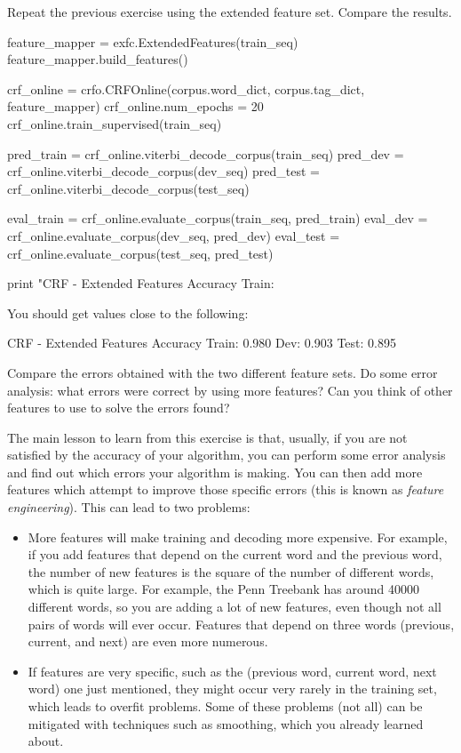 \begin{exercise}\label{exer:crf2}
Repeat the previous exercise using the extended feature set. Compare the results.

\begin{python}
feature_mapper = exfc.ExtendedFeatures(train_seq)
feature_mapper.build_features()

crf_online = crfo.CRFOnline(corpus.word_dict, corpus.tag_dict, feature_mapper)
crf_online.num_epochs = 20
crf_online.train_supervised(train_seq)

pred_train = crf_online.viterbi_decode_corpus(train_seq)
pred_dev = crf_online.viterbi_decode_corpus(dev_seq)
pred_test = crf_online.viterbi_decode_corpus(test_seq)

eval_train = crf_online.evaluate_corpus(train_seq, pred_train)
eval_dev = crf_online.evaluate_corpus(dev_seq, pred_dev)
eval_test = crf_online.evaluate_corpus(test_seq, pred_test)

print "CRF - Extended Features Accuracy Train: %
\end{python}

You should get values close to the following:
\begin{python}
CRF - Extended Features Accuracy Train: 0.980 Dev: 0.903 Test: 0.895
\end{python}

Compare the errors obtained with the two different feature
sets. Do some error analysis: what errors were correct by using
more features? Can you think of other features to use to solve the
errors found?
\end{exercise}

The main lesson to learn from this exercise is that, usually, if you are not satisfied by the accuracy of your algorithm, you can perform some error analysis and find out which errors your algorithm is making. You can then add more features which attempt to improve those specific errors (this is known as \emph{feature engineering}). This can lead to two problems:
\begin{itemize}
\item More features will make training and decoding more expensive. For example, if you add features that depend on the current word and the previous word, the number of new features is the square of the number of different words, which is quite large. For example, the Penn Treebank has around 40000 different words, so you are adding a lot of new features, even though not all pairs of words will ever occur. Features that depend on three words (previous, current, and next) are even more numerous.
\item If features are very specific, such as the (previous word, current word, next word) one just mentioned, they might occur very rarely in the training set, which leads to overfit problems. Some of these problems (not all) can be mitigated with techniques such as smoothing, which you already learned about.
\end{itemize}







